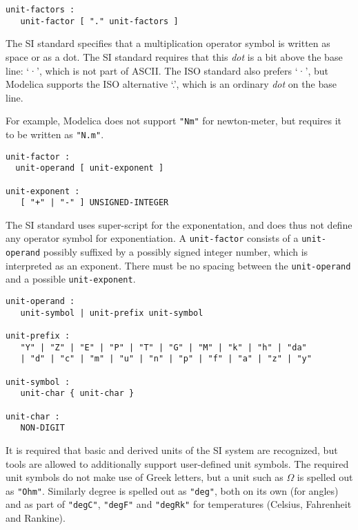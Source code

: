 \begin{lstlisting}[language=grammar]
unit-factors :
   unit-factor [ "." unit-factors ]
\end{lstlisting}

The SI standard specifies that a multiplication operator symbol is written as space or as a dot.
The SI standard requires that this \emph{dot} is a bit above the base line: `·', which is not part of ASCII.
The ISO standard also prefers `·', but Modelica supports the ISO alternative `.', which is an ordinary \emph{dot} on the base line.

For example, Modelica does not support \lstinline!"Nm"! for newton-meter, but requires it to be written as \lstinline!"N.m"!.

\begin{lstlisting}[language=grammar]
unit-factor :
  unit-operand [ unit-exponent ]

unit-exponent :
   [ "+" | "-" ] UNSIGNED-INTEGER
\end{lstlisting}

The SI standard uses super-script for the exponentation, and does thus not define any operator symbol for exponentiation.
A \lstinline[language=grammar]!unit-factor! consists of a \lstinline[language=grammar]!unit-operand! possibly suffixed by a possibly signed integer number, which is interpreted as an exponent.
There must be no spacing between the \lstinline[language=grammar]!unit-operand! and a possible \lstinline[language=grammar]!unit-exponent!.

\begin{lstlisting}[language=grammar]
unit-operand :
   unit-symbol | unit-prefix unit-symbol

unit-prefix :
   "Y" | "Z" | "E" | "P" | "T" | "G" | "M" | "k" | "h" | "da"
   | "d" | "c" | "m" | "u" | "n" | "p" | "f" | "a" | "z" | "y"

unit-symbol :
   unit-char { unit-char }

unit-char :
   NON-DIGIT
\end{lstlisting}

It is required that basic and derived units of the SI system are recognized, but tools are allowed to additionally support user-defined unit symbols.
The required unit symbols do not make use of Greek letters, but a unit such as $\Omega$ is spelled out as \lstinline!"Ohm"!.
Similarly degree is spelled out as \lstinline!"deg"!, both on its own (for angles) and as part of \lstinline!"degC"!, \lstinline!"degF"! and \lstinline!"degRk"! for temperatures (Celsius, Fahrenheit and Rankine).

